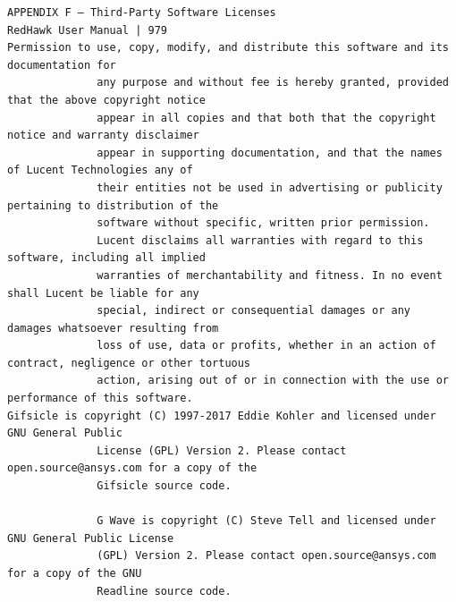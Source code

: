 \begin{lstlisting}[basicstyle=\ttfamily\scriptsize,breaklines=true]
APPENDIX F — Third-Party Software Licenses                                   RedHawk User Manual | 979
Permission to use, copy, modify, and distribute this software and its documentation for
              any purpose and without fee is hereby granted, provided that the above copyright notice
              appear in all copies and that both that the copyright notice and warranty disclaimer
              appear in supporting documentation, and that the names of Lucent Technologies any of
              their entities not be used in advertising or publicity pertaining to distribution of the
              software without specific, written prior permission.
              Lucent disclaims all warranties with regard to this software, including all implied
              warranties of merchantability and fitness. In no event shall Lucent be liable for any
              special, indirect or consequential damages or any damages whatsoever resulting from
              loss of use, data or profits, whether in an action of contract, negligence or other tortuous
              action, arising out of or in connection with the use or performance of this software.
Gifsicle is copyright (C) 1997-2017 Eddie Kohler and licensed under GNU General Public
              License (GPL) Version 2. Please contact open.source@ansys.com for a copy of the
              Gifsicle source code.

              G Wave is copyright (C) Steve Tell and licensed under GNU General Public License
              (GPL) Version 2. Please contact open.source@ansys.com for a copy of the GNU
              Readline source code.


\end{lstlisting}
